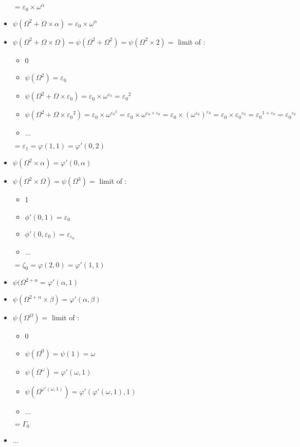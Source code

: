 \documentclass[10pt]{article}
\begin{document}
\begin{itemize}
\begin{itemize}
   \end{itemize}
   \( = \varepsilon_0 \times \omega^\alpha \)
\item \( \psi(\Omega^2+\Omega \times \alpha) = \varepsilon_0 \times \omega^\alpha \)
\item \( \psi(\Omega^2+\Omega \times \Omega) = \psi(\Omega^2+\Omega^2) = \psi(\Omega^2 \times 2) = \) limit of :
   \begin{itemize}
     \setlength{\itemsep}{1pt}
     \setlength{\parskip}{0pt}
     \setlength{\parsep}{0pt}
   \item  0
   \item \( \psi(\Omega^2) = \varepsilon_0 \)
   \item \( \psi(\Omega^2+\Omega \times \varepsilon_0) = \varepsilon_0 \times \omega^{\varepsilon_0} = {\varepsilon_0}^2 \)
   \item \( \psi(\Omega^2+\Omega \times {\varepsilon_0}^2) = \varepsilon_0 \times \omega ^{{\varepsilon_0}^2} = \varepsilon_0 \times \omega^{\varepsilon_0 \times \varepsilon_0} = \varepsilon_0 \times (\omega^{\varepsilon_0})^{\varepsilon_0} = \varepsilon_0 \times {\varepsilon_0}^{\varepsilon_0} = {\varepsilon_0}^{1+\varepsilon_0} = {\varepsilon_0}^{\varepsilon_0} \)
   \item \( \ldots \)
   \end{itemize} 
   \( = \varepsilon_1 = \varphi(1,1) = \varphi'(0,2) \)
\item \( \psi(\Omega^2 \times \alpha) = \varphi'(0,\alpha) \)
\item \( \psi(\Omega^2 \times \Omega) = \psi(\Omega^3) = \) limit of : 
   \begin{itemize}
     \setlength{\itemsep}{1pt}
     \setlength{\parskip}{0pt}
     \setlength{\parsep}{0pt}
   \item  1
   \item \( \phi'(0,1) = \varepsilon_0 \)
   \item \( \phi'(0,\varepsilon_0) = \varepsilon_{\varepsilon_0} \)
   \item \( \ldots \)
   \end{itemize} 
   \( = \zeta_0 = \varphi(2,0) = \varphi'(1,1) \)
\item \( \psi(\Omega^{2+\alpha} = \varphi'(\alpha,1) \)
\item \( \psi(\Omega^{2+\alpha} \times \beta) = \varphi'(\alpha,\beta) \)
\item \( \psi(\Omega^\Omega) = \) limit of : 
   \begin{itemize}
     \setlength{\itemsep}{1pt}
     \setlength{\parskip}{0pt}
     \setlength{\parsep}{0pt}
   \item 0
   \item \( \psi(\Omega^0) = \psi(1) = \omega \)
   \item \( \psi(\Omega^\omega) = \varphi'(\omega,1) \)
   \item \( \psi(\Omega^{\varphi'(\omega,1)}) = \varphi'(\varphi'(\omega,1),1) \)
   \item \( \ldots \)
   \end{itemize} 
   \( = \Gamma_0 \)
\item \( \ldots \)
\end{itemize}
\end{document}
